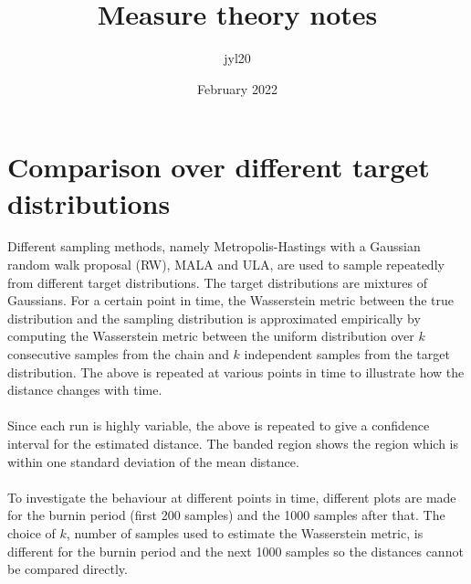 \documentclass{article}
\title{Measure theory notes}
\author{jyl20 }
\date{February 2022}
\theoremstyle{definition}
\newcommand{\1}{\mathbbm{1}}
\begin{document}
\section{Comparison over different target distributions}
Different sampling methods, namely Metropolis-Hastings with a Gaussian random walk proposal (RW), MALA and ULA, are used to sample repeatedly from different target distributions. The target distributions are mixtures of Gaussians. For a certain point in time, the Wasserstein metric between the true distribution and the sampling distribution is approximated empirically by computing the Wasserstein metric between the uniform distribution over $k$ consecutive samples from the chain and $k$ independent samples from the target distribution. The above is repeated at various points in time to illustrate how the distance changes with time.
\\\\
Since each run is highly variable, the above is repeated to give a confidence interval for the estimated distance. The banded region shows the region which is within one standard deviation of the mean distance.
\\\\
To investigate the behaviour at different points in time, different plots are made for the burnin period (first 200 samples) and the 1000 samples after that. The choice of $k$, number of samples used to estimate the Wasserstein metric, is different for the burnin period and the next 1000 samples so the distances cannot be compared directly.
\end{document}
